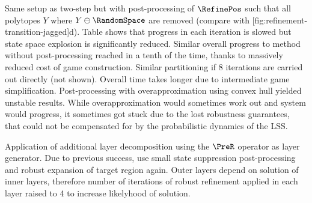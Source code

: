     Same setup as two-step but with post-processing of $\RefinePos$ such that all polytopes $Y$ where $Y \ominus \RandomSpace$ are removed (compare with [fig:refinement-transition-jagged]d).
    Table \in[TODO] shows that progress in each iteration is slowed but state space explosion is significantly reduced.
    Similar overall progress to method without post-processing reached in a tenth of the time, thanks to massively reduced cost of game construction.
    Similar partitioning if 8 iterations are carried out directly (not shown).
    Overall time takes longer due to intermediate game simplification.
    Post-processing with overapproximation using convex hull yielded unstable results.
    While overapproximation would sometimes work out and system would progress, it sometimes got stuck due to the lost robustness guarantees, that could not be compensated for by the probabilistic dynamics of the LSS.

\stopsubsection


\startsubsection[title={Positive Robust Refinement with Layer Decomposition},reference=sec:cases-integrator-layered]


    Application of additional layer decomposition using the $\PreR$ operator as layer generator.
    Due to previous success, use small state suppression post-processing and robust expansion of target region again.
    Outer layers depend on solution of inner layers, therefore number of iterations of robust refinement applied in each layer raised to 4 to increase likelyhood of solution.

